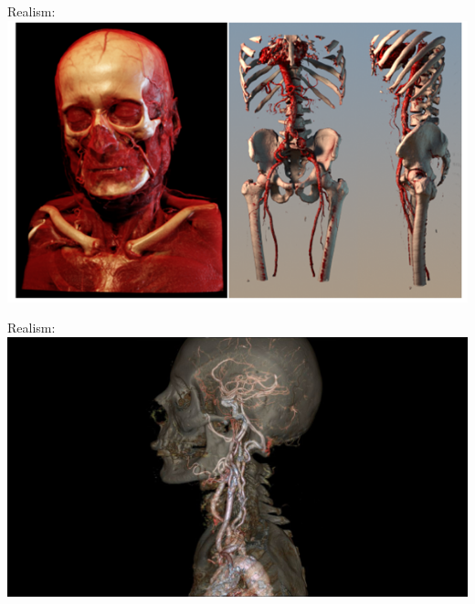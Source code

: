 \documentclass{beamer}
\begin{document}
\begin{frame}
	Realism:
	\includegraphics[width=\textwidth]{images/medical_visualisation}
\end{frame}

\begin{frame}
	Realism:
	\includegraphics[width=\textwidth]{images/realistic_transparent}
\end{frame}
\end{document}
